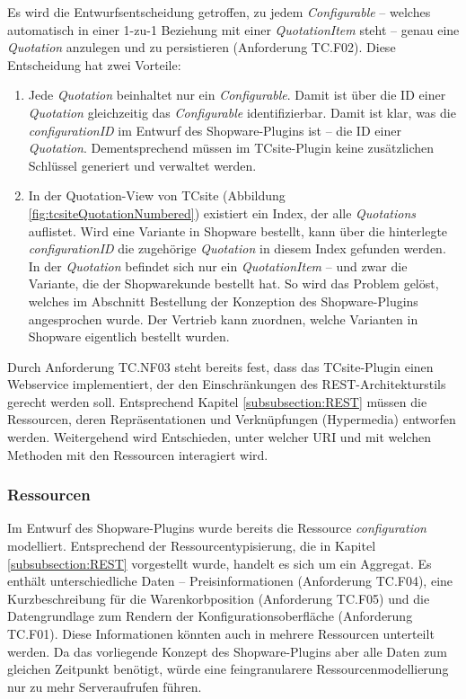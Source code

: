 \documentclass[12pt,a4paper,bibliography=totocnumbered,listof=totoc]{scrartcl}
\begin{document}
Es wird die Entwurfsentscheidung getroffen, zu jedem \emph{Configurable} -- welches automatisch in einer 1-zu-1 Beziehung mit einer \emph{QuotationItem} steht -- genau eine \emph{Quotation} anzulegen und zu persistieren (Anforderung TC.F02). Diese Entscheidung hat zwei Vorteile:
\begin{enumerate}
\item Jede \emph{Quotation} beinhaltet nur ein \emph{Configurable}. Damit ist über die ID einer \emph{Quotation} gleichzeitig das \emph{Configurable} identifizierbar. Damit ist klar, was die \emph{configurationID} im Entwurf des Shopware-Plugins ist -- die ID einer \emph{Quotation}.  Dementsprechend müssen im TCsite-Plugin keine zusätzlichen Schlüssel generiert und verwaltet werden.
\item In der Quotation-View von TCsite (Abbildung \ref{fig:tcsiteQuotationNumbered}) existiert ein Index, der alle \emph{Quotations} auflistet. Wird eine Variante in Shopware bestellt, kann über die hinterlegte \emph{configurationID} die zugehörige \emph{Quotation} in diesem Index gefunden werden. In der \emph{Quotation} befindet sich nur ein \emph{QuotationItem} -- und zwar die Variante, die der Shopwarekunde bestellt hat. So wird das Problem gelöst, welches im Abschnitt \glqq Bestellung\grqq{} der Konzeption des Shopware-Plugins angesprochen wurde. Der Vertrieb kann zuordnen, welche Varianten in Shopware eigentlich bestellt wurden.
\end{enumerate}

Durch Anforderung TC.NF03 steht bereits fest, dass das TCsite-Plugin einen Webservice implementiert, der den Einschränkungen des REST-Architekturstils gerecht werden soll. Entsprechend Kapitel \ref{subsubsection:REST} müssen die Ressourcen, deren Repräsentationen und Verknüpfungen (Hypermedia) entworfen werden. Weitergehend wird Entschieden, unter welcher URI und mit welchen Methoden mit den Ressourcen interagiert wird.

\subsubsection{Ressourcen}
Im Entwurf des Shopware-Plugins wurde bereits die Ressource \emph{configuration} modelliert. Entsprechend der Ressourcentypisierung, die in Kapitel \ref{subsubsection:REST} vorgestellt wurde, handelt es sich um ein Aggregat. Es enthält unterschiedliche Daten -- Preisinformationen (Anforderung TC.F04), eine Kurzbeschreibung für die Warenkorbposition (Anforderung TC.F05) und die Datengrundlage zum Rendern der Konfigurationsoberfläche (Anforderung TC.F01). Diese Informationen könnten auch in mehrere Ressourcen unterteilt werden. Da das vorliegende Konzept des Shopware-Plugins aber alle Daten zum gleichen Zeitpunkt benötigt, würde eine feingranularere Ressourcenmodellierung nur zu mehr Serveraufrufen führen.
\end{document}
